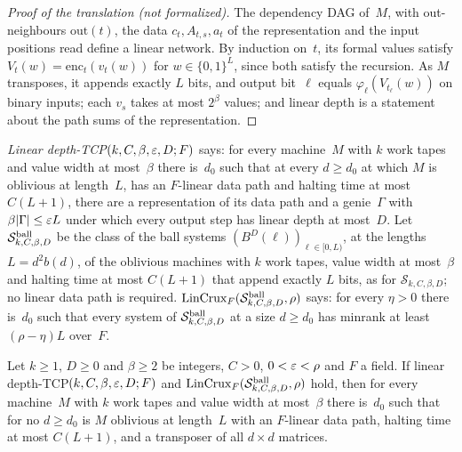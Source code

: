 \begin{proof}[Proof of the translation (not formalized)]
The dependency DAG of~$M$, with out-neighbours $\mathrm{out}(t)$, the data $c_t,A_{t,s},a_t$ of the representation and the
input positions read define a linear network. By induction on~$t$, its formal values satisfy $V_t(w)=\mathrm{enc}_t(v_t(w))$
for $w\in\{0,1\}^L$, since both satisfy the recursion. As $M$ transposes, it appends exactly $L$ bits, and output bit~$\ell$
equals $\varphi_\ell(V_{t_\ell}(w))$ on binary inputs; each $v_s$ takes at most $2^\beta$ values; and linear depth is a
statement about the path sums of the representation.
\end{proof}

\begin{definition}\label{def:lin-hyp}
\emph{Linear depth-TCP}$(k,C,\beta,\varepsilon,D;F)$ says: for every machine~$M$ with $k$ work tapes and value width at most~$\beta$
there is~$d_0$ such that at every $d\ge d_0$ at which $M$ is oblivious at length~$L$, has an $F$-linear data path and halting
time at most $C(L+1)$, there are a representation of its data path and a genie~$\Gamma$ with $\beta\lvert \Gamma \rvert\le\varepsilon L$ under
which every output step has linear depth at most~$D$. Let $\mathcal S^{\mathrm{ball}}_{k,C,\beta,D}$ be the class of the ball systems
$(B^D(\ell))_{\ell\in[0,L)}$, at the lengths $L=d^2b(d)$, of the oblivious machines with $k$ work tapes, value width at
most~$\beta$ and halting time at most $C(L+1)$ that append exactly $L$ bits, as for $\mathcal S_{k,C,\beta,D}$; no linear data
path is required. $\mathrm{LinCrux}_F(\mathcal S^{\mathrm{ball}}_{k,C,\beta,D},\rho)$ says: for every $\eta>0$ there is~$d_0$ such
that every system of $\mathcal S^{\mathrm{ball}}_{k,C,\beta,D}$ at a size $d\ge d_0$ has minrank at least $(\rho-\eta)L$ over~$F$.
\end{definition}

\begin{theorem}\label{thm:Dlin}
Let $k\ge1$, $D\ge0$ and $\beta\ge2$ be integers, $C>0$, $0<\varepsilon<\rho$ and $F$ a field. If linear depth-TCP$(k,C,\beta,\varepsilon,D;F)$
and $\mathrm{LinCrux}_F(\mathcal S^{\mathrm{ball}}_{k,C,\beta,D},\rho)$ hold, then for every machine~$M$ with $k$ work tapes and value width at
most~$\beta$ there is~$d_0$ such that for no $d\ge d_0$ is $M$ oblivious at length~$L$ with an $F$-linear data path, halting
time at most $C(L+1)$, and a transposer of all $d\times d$ matrices.
\end{theorem}

